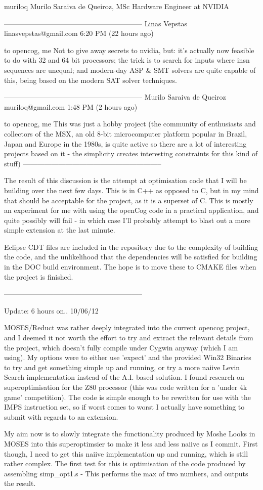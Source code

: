 \documentclass[11pt]{article}
\begin{document}
muriloq
Murilo Saraiva de Queiroz, MSc
Hardware Engineer at NVIDIA

-----------------------------------------------------------
Linas Vepstas linasvepstas@gmail.com
6:20 PM (22 hours ago)

to opencog, me 
Not to give away secrets to nvidia, but: it's actually now feasible to do with 32 and 64 bit processors; the trick is to search for inputs where insn sequences are unequal; and modern-day ASP & SMT solvers are quite capable of this, being based on the modern SAT solver techniques.

-----------------------------------------------------------
Murilo Saraiva de Queiroz muriloq@gmail.com
1:48 PM (2 hours ago)

to opencog, me 
This was just a hobby project (the community of enthusiasts and collectors of the MSX, an old 8-bit microcomputer platform popular in Brazil, Japan and Europe in the 1980s, is quite active so there are a lot of interesting projects based on it - the simplicity creates interesting constraints for this kind of stuff)
-----------------------------------------------------------
 
The result of this discussion is the attempt at optimisation code that I will be building over the next few days. This is in C++ as opposed to C, but in my mind that should be acceptable for the project, as it is a superset of C. This is mostly an experiment for me with using the openCog code in a practical application, and quite possibly will fail - in which case I'll probably attempt to blast out a more simple extension at the last minute.

Eclipse CDT files are included in the repository due to the complexity of building the code, and the unlikelihood that the dependencies will be satisfied for building in the DOC build environment. The hope is to move these to CMAKE files when the project is finished.

-----------------------------------------------------------

Update: 6 hours on.. 10/06/12

MOSES/Reduct was rather deeply integrated into the current opencog project, and I deemed it not worth the effort to try and extract the relevant details from the project, which doesn't fully compile under Cygwin anyway (which I am using). My options were to either use 'expect' and the provided Win32 Binaries to try and get something simple up and running, or try a more naiive Levin Search implementation instead of the A.I. based solution. I found research on superoptimisation for the Z80 processor (this was code written for a 'under 4k game' competition). The code is simple enough to be rewritten for use with the IMPS instruction set, so if worst comes to worst I actually have something to submit with regards to an extension.

My aim now is to slowly integrate the functionality produced by Moshe Looks in MOSES into this superoptimsier to make it less and less naiive as I commit. First though, I need to get this naiive implementation up and running, which is still rather complex. 
The first test for this is optimisation of the code produced by assembling simp_opt1.s - This performs the max of two numbers, and outputs the result.
\end{document}
